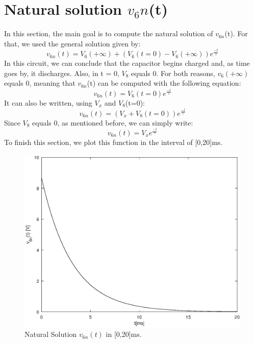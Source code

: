 \section{Natural solution $v_6n$(t)}
In this section, the main goal is to compute the natural solution of $v_{6n}$(t). For that, we used the general solution given by:
\begin{equation}
v_{6n}(t) = V_6(+\infty) + (V_6(t=0) - V_6(+\infty))e^{\frac{-t}{\tau}}
  \label{eq:v6ncomplete}
\end{equation}
In this circuit, we can conclude that the capacitor begins charged and, as time goes by, it discharges. Also, in t = 0, $V_8$ equals 0. 
For both reasons, $v_6(+\infty)$ equals 0, meaning that $v_{6n}$(t) can be computed with the following equation:
\begin{equation}
v_{6n}(t) = V_6(t=0)e^{\frac{-t}{\tau}}
  \label{eq:v6nfinal}
\end{equation}
It can also be written, using $V_x$ and $V_8$(t=0):
\begin{equation}
v_{6n}(t) = (V_x + V_8(t=0))e^{\frac{-t}{\tau}}
  \label{eq:v6nwithv8vx}
\end{equation}
Since $V_8$ equals 0, as mentioned before, we can simply write:
\begin{equation}
v_{6n}(t) = V_xe^{\frac{-t}{\tau}}
  \label{eq:v6nwithvx}
\end{equation}
To finish this section, we plot this function in the interval of [0,20]ms.
\begin{figure}[h!] \centering
\includegraphics[width=0.8\linewidth]{v6n.eps}
\caption{Natural Solution $v_{6n}(t)$ in [0,20]ms.}
\label{fig:v6n}
\end{figure}

\newpage
